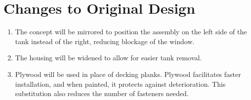 \documentclass[12pt]{article}
\begin{document}
\section{Changes to Original Design}
\begin{enumerate}
    \item The concept will be mirrored to position the assembly on the left side of the tank instead of the right, reducing blockage of the window.
    \item The housing will be widened to allow for easier tank removal.
    \item Plywood will be used in place of decking planks. Plywood facilitates faster installation, and when painted, it protects against deterioration. This substitution also reduces the number of fasteners needed.
\end{enumerate}
\end{document}

